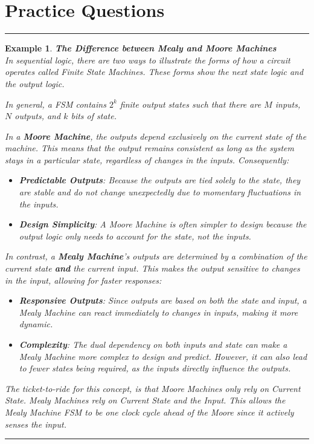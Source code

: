 \documentclass[12pt]{article}
\newtheorem{example}{Example}
\newenvironment{examp}
{
	\vspace{.5cm}
	\hrule
\begin{example}\upshape}
	{\hrule
		\vspace{0.5cm}
\end{example}}
\begin{document}
\section*{Practice Questions}
\begin{examp}
	\vspace{.5cm}
	\textbf{The Difference between Mealy and Moore Machines}\\
	In sequential logic, there are two ways to illustrate the forms of how a circuit
	operates called \textit{Finite State Machines}. These forms show the
	\textit{next state logic} and the \textit{output logic}.
	
	In general, a FSM contains \(2^k\) \textit{finite} output states such that
	there are \(M\) inputs, \(N\) outputs, and \(k\) bits of state.
	
	In a \textbf{Moore Machine}, the outputs depend exclusively on the \textit{current state} of the machine. This means that the output remains consistent as long as the system stays in a particular state, regardless of changes in the inputs. Consequently:
	\begin{itemize}
		\item \textbf{Predictable Outputs}: Because the outputs are tied solely to the state, they are stable and do not change unexpectedly due to momentary fluctuations in the inputs.
		\item \textbf{Design Simplicity}: A Moore Machine is often simpler to design because the output logic only needs to account for the state, not the inputs.
	\end{itemize}
	In contrast, a \textbf{Mealy Machine}’s outputs are determined by a combination of the \textit{current state} \textbf{and} the \textit{current input}. This makes the output sensitive to changes in the input, allowing for faster responses:
	
	\begin{itemize}
		\item \textbf{Responsive Outputs}: Since outputs are based on both the state and input, a Mealy Machine can react immediately to changes in inputs, making it more dynamic.
		      
		\item \textbf{Complexity}: The dual dependency on both inputs and state can make a Mealy Machine more complex to design and predict. However, it can also lead to fewer states being required, as the inputs directly influence the outputs.
	\end{itemize}
	
	The ticket-to-ride for this concept, is that Moore Machines only rely on
	Current State. Mealy Machines rely on Current State and the Input. This allows
	the Mealy Machine FSM to be one clock cycle ahead of the Moore since it
	actively senses the input.
	
\end{examp}
\end{document}
